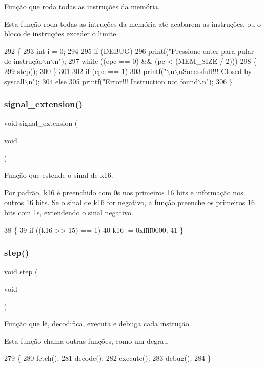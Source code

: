 Função que roda todas as instruções da memória. 

Esta função roda todas as intruções da memória até acabarem as instruções, ou o bloco de instruções exceder o limite 
\begin{DoxyCode}
292 \{
293     \textcolor{keywordtype}{int} i = 0;
294 
295     \textcolor{keywordflow}{if} (DEBUG)
296         printf(\textcolor{stringliteral}{"Pressione enter para pular de instrução\(\backslash\)n\(\backslash\)n"});
297     \textcolor{keywordflow}{while} ((epc == 0) && (pc < (MEM_SIZE / 2)))
298     \{
299         step();
300     \}
301 
302     \textcolor{keywordflow}{if} (epc == 1)
303         printf(\textcolor{stringliteral}{"\(\backslash\)n\(\backslash\)nSucessfull!!! Closed by syscall\(\backslash\)n"});
304     \textcolor{keywordflow}{else}
305         printf(\textcolor{stringliteral}{"Error!!! Instruction not found\(\backslash\)n"});
306 \}
\end{DoxyCode}
\mbox{\label{recorder_8h_a19d0bbfdb5f0b372b4d230b601aaebd6}} 
\subsubsection{signal\+\_\+extension()}
{\footnotesize\ttfamily void signal\+\_\+extension (\begin{DoxyParamCaption}\item[{void}]{ }\end{DoxyParamCaption})}



Função que estende o sinal de k16. 

Por padrão, k16 é preenchido com 0\textquotesingle{}s nos primeiros 16 bits e informação nos outros 16 bits. Se o sinal de k16 for negativo, a função preenche os primeiros 16 bits com 1\textquotesingle{}s, extendendo o sinal negativo. 
\begin{DoxyCode}
38 \{
39     \textcolor{keywordflow}{if} ((k16 >> 15) == 1)
40         k16 |= 0xffff0000;
41 \}
\end{DoxyCode}
\mbox{\label{recorder_8h_a9f1dffc0dde87c0cc5eea9fc77d89b28}} 
\subsubsection{step()}
{\footnotesize\ttfamily void step (\begin{DoxyParamCaption}\item[{void}]{ }\end{DoxyParamCaption})}



Função que lê, decodifica, executa e debuga cada instrução. 

Esta função chama outras funções, como um degrau 
\begin{DoxyCode}
279 \{
280     fetch();
281     decode();
282     execute();
283     debug();
284 \}
\end{DoxyCode}
